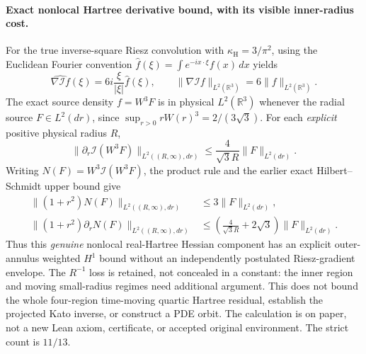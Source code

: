 \documentclass[11pt]{amsart}
\begin{document}
\paragraph{Exact nonlocal Hartree derivative bound, with its visible inner-radius cost.}
For the true inverse-square Riesz convolution with
\(\kappa_{\mathrm H}=3/\pi^2\), using the Euclidean Fourier convention
\(\widehat f(\xi)=\int e^{-ix\cdot\xi}f(x)\,dx\) yields
\[
 \widehat{\nabla\mathcal I f}(\xi)
   =6i\frac{\xi}{|\xi|}\widehat f(\xi),\qquad
 \|\nabla\mathcal I f\|_{L^2(\mathbb R^3)}
   =6\|f\|_{L^2(\mathbb R^3)}.
\]
The exact source density \(f=W^3F\) is in physical
\(L^2(\mathbb R^3)\) whenever the radial source
\(F\in L^2(dr)\), since
\(\sup_{r>0}rW(r)^3=2/(3\sqrt3)\).
For each \emph{explicit} positive physical radius \(R\),
\[
 \|\partial_r\mathcal I(W^3F)\|_{L^2((R,\infty),dr)}
   \le\frac4{\sqrt3R}\|F\|_{L^2(dr)}.
\]
Writing \(N(F)=W^3\mathcal I(W^3F)\), the product rule
and the earlier exact Hilbert--Schmidt upper bound give
\[
 \begin{split}
 \|(1+r^2)N(F)\|_{L^2((R,\infty),dr)}
 &\le3\|F\|_{L^2(dr)},\\
 \|(1+r^2)\partial_rN(F)\|_{L^2((R,\infty),dr)}
 &\le\left(\frac4{\sqrt3R}+2\sqrt3\right)
       \|F\|_{L^2(dr)}.
 \end{split}
\]
Thus this \emph{genuine} nonlocal real-Hartree Hessian
component has an explicit outer-annulus weighted \(H^1\)
bound without an independently postulated Riesz-gradient
envelope. The \(R^{-1}\) loss is retained, not concealed
in a constant: the inner region and moving small-radius
regimes need additional argument. This does not bound
the whole four-region time-moving quartic Hartree residual,
establish the projected Kato inverse, or construct a PDE orbit.
The calculation is on paper, not a new Lean axiom, certificate,
or accepted original environment. The strict count is \(11/13\).
\end{document}
